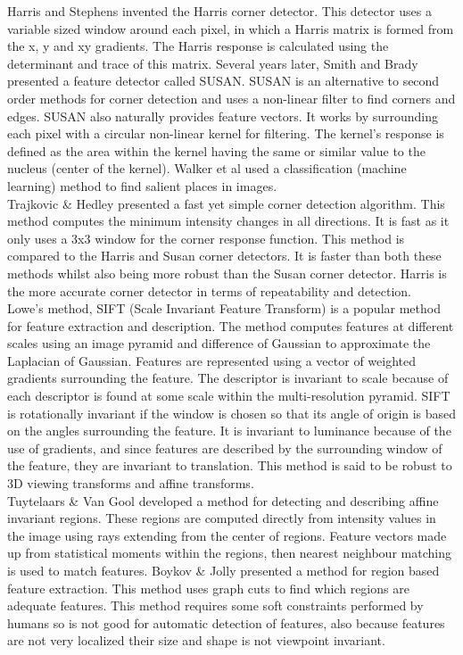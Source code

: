 Harris and Stephens \cite{Harris88Combined} invented the Harris corner detector. This detector uses a variable sized window around each pixel, in which a Harris matrix is formed from the x, y and xy gradients. The Harris response is calculated using the determinant and trace of this matrix. Several years later, Smith and Brady \cite{Smith97Susan, Smith92New} presented a feature detector called SUSAN. SUSAN is an alternative to second order methods for corner detection and uses a non-linear filter to find corners and edges. SUSAN also naturally provides feature vectors. It works by surrounding each pixel with a circular non-linear kernel for filtering. The kernel's response is defined as the area within the kernel having the same or similar value to the nucleus (center of the kernel). Walker et al \cite{Walker98Locating} used a classification (machine learning) method to find salient places in images.\\


Trajkovic \& Hedley \cite{Trajkovic98Fast} presented a fast yet simple corner detection algorithm. This method computes the minimum intensity changes in all directions. It is fast as it only uses a 3x3 window for the corner response function. This method is compared to the Harris and Susan corner detectors. It is faster than both these methods whilst also being more robust than the Susan corner detector. Harris is the more accurate corner detector in terms of repeatability and detection.\\


Lowe's \cite{Lowe04Distinctive,Lowe99Object} method, SIFT (Scale Invariant Feature Transform) is a popular method for feature extraction and description. The method computes features at different scales using an image pyramid and difference of Gaussian to approximate the Laplacian of Gaussian. Features are represented using a vector of weighted gradients surrounding the feature. The descriptor is invariant to scale because of each descriptor is found at some scale within the multi-resolution pyramid. SIFT is rotationally invariant if the window is chosen so that its angle of origin is based on the angles surrounding the feature. It is invariant to luminance because of the use of gradients, and since features are described by the surrounding window of the feature, they are invariant to translation. This method is said to be robust to 3D viewing transforms and affine transforms.\\


Tuytelaars \& Van Gool \cite{Tuytelaars00Wide} developed a method for detecting and describing affine invariant regions. These regions are computed directly from intensity values in the image using rays extending from the center of regions. Feature vectors made up from statistical moments within the regions, then nearest neighbour matching is used to match features. Boykov \& Jolly \cite{Boykov01Interactive} presented a method for region based feature extraction. This method uses graph cuts to find which regions are adequate features. This method requires some soft constraints performed by humans so is not good for automatic detection of features, also because features are not very localized their size and shape is not viewpoint invariant.\\


